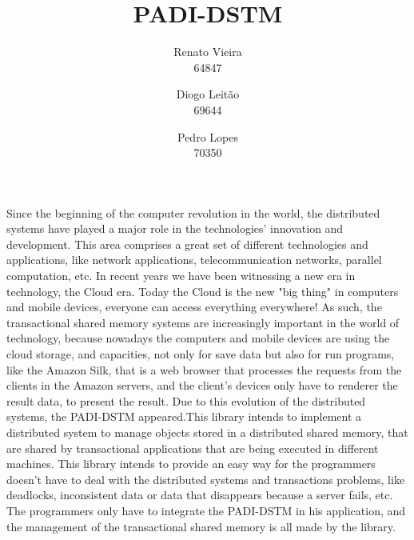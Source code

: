 \documentclass[times, 10pt,twocolumn]{article}
\begin{document}
\title{PADI-DSTM}

\author{Renato Vieira\\
64847
\and
Diogo Leit\~ao\\
69644
\and
Pedro Lopes\\
70350
}



\maketitle
\thispagestyle{empty}


Since the beginning of the computer revolution in the world, the distributed systems have played a major role in the technologies' innovation and development. This area comprises a great set of different technologies and applications, like network applications, telecommunication networks, parallel computation, etc. In recent years we have been witnessing a new era in technology, the Cloud era. Today the Cloud is the new "big thing" in computers and mobile devices, everyone can access everything  everywhere! As such, the transactional shared memory systems are increasingly important in the world of technology, because nowadays the computers and mobile devices are using the cloud storage, and capacities, not only for save data but also for run programs, like the Amazon Silk, that is a web browser that processes the requests from the clients in the Amazon servers, and the client's devices only have to renderer the result data, to present the result. Due to this evolution of the distributed systems, the PADI-DSTM appeared.This library intends to implement a distributed system to manage objects stored in a distributed shared memory, that are shared by transactional applications that are being executed in different machines. This library intends to provide an easy way for the programmers doesn't have to deal with the distributed systems and transactions problems, like deadlocks, inconsistent data or data that disappears because a server fails, etc. The programmers only have to integrate the PADI-DSTM in his application, and the management of the transactional shared memory is all made by the library.

\end{document}

